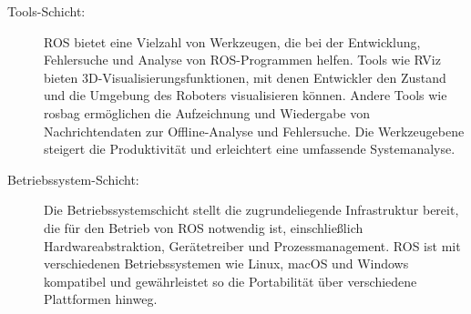 \begin{description}
    
    \item[Tools-Schicht:] ROS bietet eine Vielzahl von Werkzeugen, die bei der Entwicklung, Fehlersuche und Analyse von ROS-Programmen helfen. Tools wie RViz bieten 3D-Visualisierungsfunktionen, mit denen Entwickler den Zustand und die Umgebung des Roboters visualisieren können. Andere Tools wie rosbag ermöglichen die Aufzeichnung und Wiedergabe von Nachrichtendaten zur Offline-Analyse und Fehlersuche. Die Werkzeugebene steigert die Produktivität und erleichtert eine umfassende Systemanalyse.
    
    \item[Betriebssystem-Schicht:] Die Betriebssystemschicht stellt die zugrundeliegende Infrastruktur bereit, die für den Betrieb von ROS notwendig ist, einschließlich Hardwareabstraktion, Gerätetreiber und Prozessmanagement. ROS ist mit verschiedenen Betriebssystemen wie Linux, macOS und Windows kompatibel und gewährleistet so die Portabilität über verschiedene Plattformen hinweg.
\end{description}

